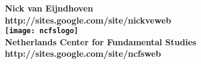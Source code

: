 \documentclass[a4paper,landscape,pdftex]{article}
\author{Nick van Eijndhoven}
\date{Copyright $\copyright$ NCFS, 2008}
\begin{document}
\begin{titlepage}
\begin{center}
\vspace*{-3.5cm}
{\LARGE \bf
 Nick van Eijndhoven\\[1mm]
 http://sites.google.com/site/nickveweb\\
 \texttt{[image: ncfslogo]}\\[-2mm]
 Netherlands Center for Fundamental Studies\\[2mm]
 http://sites.google.com/site/ncfsweb
}
\end{center}
\end{titlepage}







\end{document}
